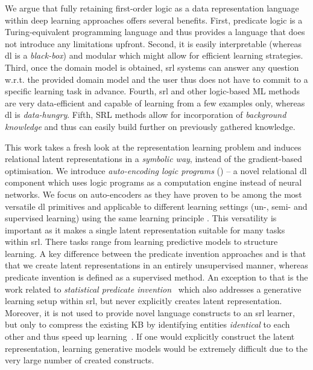 We argue that fully retaining first-order logic as a data representation language within deep learning approaches offers several benefits.
First, predicate logic is a Turing-equivalent programming language and thus provides a language that does not introduce any limitations upfront.
Second, it is easily interpretable (whereas \gls{dl} is a \textit{black-box}) and modular which might allow for efficient learning strategies.
Third, once the domain model is obtained, \gls{srl} systems can answer any question w.r.t. the provided domain model and the user thus does not have to commit to a specific learning task in advance.
Fourth, \gls{srl} and other logic-based ML methods are very data-efficient and capable of learning from a few examples only, whereas \gls{dl} is \textit{data-hungry}.
Fifth, SRL methods allow for incorporation of \textit{background knowledge} and thus can easily build further on previously gathered knowledge.






This work takes a fresh look at the representation learning problem and induces relational latent representations in a \textit{symbolic way}, instead of the gradient-based optimisation.
We introduce \textit{auto-encoding logic programs} () -- a novel relational \gls{dl} component which uses logic programs as a computation engine instead of neural networks.
We focus on auto-encoders as they have proven to be among the most versatile \gls{dl} primitives and applicable to different learning settings (un-, semi- and supervised learning) using the same learning principle \cite{SSLVAE2014,VincentDaE,Kingma2014,BengioSAE}.
This versatility is important as it makes a single latent representation suitable for many tasks within \gls{srl}.
There tasks range from learning predictive models to structure learning.
A key difference between the predicate invention approaches and  is that that we create latent representations in an entirely unsupervised manner, whereas predicate invention is defined as a supervised method.
An exception to that is the work related to \textit{statistical predicate invention}~\cite{Kok2007} which also addresses a generative learning setup within \gls{srl}, but never explicitly creates latent representation.
Moreover, it is not used to provide novel language constructs to an \gls{srl} learner, but only to compress the existing KB by identifying entities \textit{identical} to each other and thus speed up learning~\cite{Kok:2009:LML:1553374.1553440}.
If one would explicitly construct the latent representation, learning generative models would be extremely difficult due to the very large number of created constructs.




